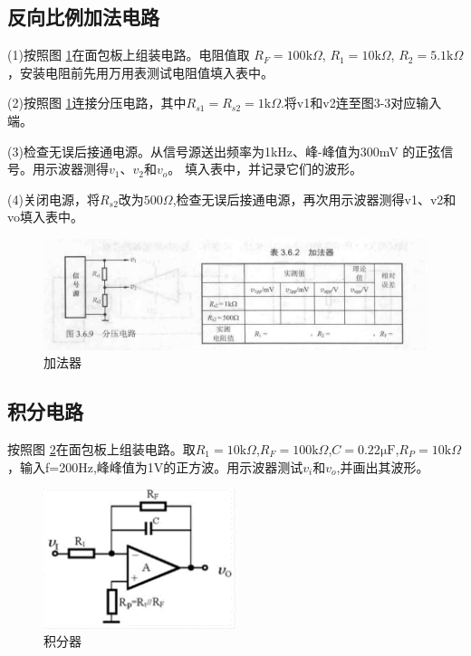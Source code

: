\documentclass[a4paper]{article}
\theoremstyle{definition}
\theoremstyle{plain}
\theoremstyle{remark}
\newcommand{\reffig}[1]{图 \ref{#1}}
\begin{document}
\subsection{反向比例加法电路}

(1)按照\reffig{加法器}在面包板上组装电路。电阻值取 $R_F=100 \mathrm{k}\Omega$, $R_1=10\mathrm{k}\Omega$, $R_2= 5.1\mathrm{k}\Omega$，安装电阻前先用万用表测试电阻值填入表中。

(2)按照\reffig{加法器}连接分压电路，其中$R_{s1}=R_{s2}=1\mathrm{k}\Omega$.将v1和v2连至图3-3对应输入端。


(3)检查无误后接通电源。从信号源送出频率为1kHz、峰-峰值为300mV 的正弦信号。用示波器测得$v_1$、$v_2$和$v_o$。 填入表中，并记录它们的波形。

(4)关闭电源，将$R_{s2}$改为$\mathrm{500}\Omega$,检查无误后接通电源，再次用示波器测得v1、v2和vo填入表中。

\begin{figure}[H]
	\centering
	\includegraphics[width=1\textwidth]{加法器}
	\caption{加法器}
	\label{加法器}
\end{figure}


\subsection{积分电路}
按照\reffig{积分器}在面包板上组装电路。取$R_1=10\mathrm{k}\Omega$,\space $R_F=100\mathrm{k}\Omega$,$C=0.22\mathrm{μF}$,$R_P= 10\mathrm{k}\Omega$，输入f=200Hz,峰峰值为1V的正方波。用示波器测试$v_i$和$v_o$,并画出其波形。

\begin{figure}[H]
	\centering
	\includegraphics[width=0.5\textwidth]{积分器}
	\caption{积分器}
	\label{积分器}
\end{figure}
\end{document}
